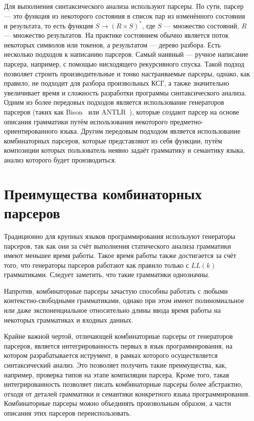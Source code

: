 \documentclass[times]{itmo-student-thesis}
\begin{document}
Для выполнения синтаксического анализа используют парсеры. По сути, парсер --- это функция из некоторого состояния в
список пар из изменённого состояния и результата, то есть функция $S \rightarrow (R \times S)^*$, где $S$
--- множество состояний, $R$ --- множество результатов. На практике состоянием обычно является поток
некоторых символов или токенов, а результатом --- дерево разбора. Есть несколько подходов к написанию парсеров. Самый
наивный --- ручное написание парсера, например, с помощью нисходящего рекурсивного спуска. Такой подход позволяет
строить производительные и тонко настраиваемые парсеры, однако, как правило, не подходит для разбора произвольных КСГ,
а также значительно увеличивает время и сложность разработки программы синтаксического анализа. Одним из более
передовых подходов является использование генераторов парсеров (таких как Bison~\cite{noauthor_bison_nodate} или
ANTLR~\cite{noauthor_antlr_nodate}), которые создают парсер на основе описания грамматики путём использования некоторого
предметно-ориентированного языка. Другим передовым подходом является использование комбинаторных парсеров, которые
представляют из себя функции, путём композиции которых пользователь неявно задаёт грамматику и семантику языка, анализ
которого будет производиться.

\section{Преимущества комбинаторных парсеров}\label{sec:parser_combinators_advantages}

Традиционно для крупных языков программирования используют генераторы парсеров, так как они за счёт выполнения
статического анализа грамматики имеют меньшее время работы. Такое время работы также достигается за счёт того, что
генераторы парсеров работают как правило только с $LL(k)$ грамматиками. Следует заметить, что такие
грамматики однозначны.

Напротив, комбинаторные парсеры зачастую способны работать с любыми контекстно-свободными грамматиками, однако при этом
имеют полиномиальное или даже экспоненциальное относительно длины ввода время работы на некоторых грамматиках и входных
данных.

Крайне важной чертой, отличающей  комбинаторные парсеры от генераторов парсеров, является интегрированность первых в
язык программирования, на котором разрабатывается иструмент, в рамках которого осуществляется синтаксический анализ.
Это  позволяет	получить  такие преимущества, как, например, проверка типов на этапе компиляции парсера. Кроме того,
такая интегрированность позволяет писать комбинаторные парсеры более абстрактно, отходя от деталей грамматики и
семантики конкретного языка программирования. Комбинаторные парсеры можно объединять произвольным образом, а части
описания этих парсеров переиспользовать.
\end{document}
